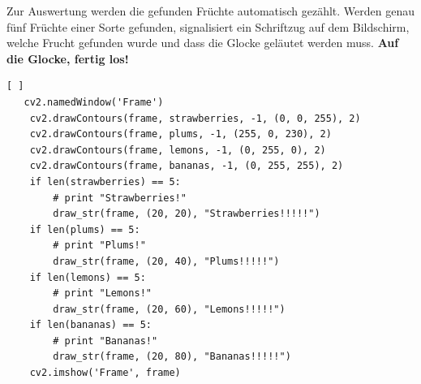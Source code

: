 Zur Auswertung werden die gefunden Früchte automatisch gezählt. Werden genau fünf Früchte einer Sorte gefunden, signalisiert ein Schriftzug auf dem Bildschirm, welche Frucht gefunden wurde und dass die Glocke geläutet werden muss. \textbf{Auf die Glocke, fertig los!}

\lstset{language=Python}
\begin{lstlisting}[ ]
   cv2.namedWindow('Frame')
    cv2.drawContours(frame, strawberries, -1, (0, 0, 255), 2)
    cv2.drawContours(frame, plums, -1, (255, 0, 230), 2)
    cv2.drawContours(frame, lemons, -1, (0, 255, 0), 2)
    cv2.drawContours(frame, bananas, -1, (0, 255, 255), 2)
    if len(strawberries) == 5:
        # print "Strawberries!"
        draw_str(frame, (20, 20), "Strawberries!!!!!")
    if len(plums) == 5:
        # print "Plums!"
        draw_str(frame, (20, 40), "Plums!!!!!")
    if len(lemons) == 5:
        # print "Lemons!"
        draw_str(frame, (20, 60), "Lemons!!!!!")
    if len(bananas) == 5:
        # print "Bananas!"
        draw_str(frame, (20, 80), "Bananas!!!!!")
    cv2.imshow('Frame', frame)
\end{lstlisting}



